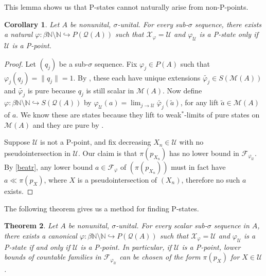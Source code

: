 \documentclass[10pt]{amsart}
\newtheorem{thm}{Theorem}[section]
\newtheorem{cor}[thm]{Corollary}
\theoremstyle{definition}
\newcommand{\Fp}{\mathscr{F}_\varphi}
\newcommand{\Xp}{\mathscr{X}_\varphi}
\newcommand{\U}{\mathscr{U}}
\begin{document}
This lemma shows us that P-states cannot naturally arise from non-P-points.

\begin{cor}\label{Pup}
    Let $A$ be nonunital, $\sigma$-unital. For every sub-$\sigma$ sequence, there exists a natural $\varphi:\beta\mathbb{N}\setminus\mathbb{N}\hookrightarrow P(\mathscr{Q}(A))$ such that $\Xp=\mathscr{U}$ and $\varphi_\mathscr{U}$ is a P-state only if $\U$ is a P-point.
\end{cor}

\begin{proof}
    Let $(q_j)$ be a sub-$\sigma$ sequence. Fix $\varphi_j\in P(A)$ such that $\varphi_j(q_j)=\|q_j\|=1$. By \cite[3.3.9]{MU90}, these each have unique extensions $\tilde{\varphi_j}\in S(\mathscr{M}(A))$ and $\tilde{\varphi_j}$ is pure because $q_j$ is still scalar in $\mathscr{M}(A)$. Now define $\varphi:\beta\mathbb{N}\setminus\mathbb{N}\hookrightarrow S(\mathscr{Q}(A))$ by $\varphi_\U(a)=\lim_{j\rightarrow\U}\tilde{\varphi_j}(\tilde{a})$, for any lift $\tilde{a}\in\mathscr{M}(A)$ of $a$. We know these are states because they lift to weak$^*$-limits of pure states on $\mathscr{M}(A)$ and they are pure by \cite[1]{AN79}.

    Suppose $\U$ is not a P-point, and fix decreasing $X_n\in\U$ with no pseudointersection in $\U$. Our claim is that $\pi(p_{X_n})$ has no lower bound in $\mathscr{F}_{\varphi_\U}$. By \ref{beatr}, any lower bound $a\in\Fp$ of $(\pi(p_{X_n}))$ must in fact have $a\ll \pi(p_X)$, where $X$ is a pseudointersection of $(X_n)$, therefore no such $a$ exists.
\end{proof}

The following theorem gives us a method for finding P-states.

\begin{thm}\label{stoneinj}
    Let $A$ be nonunital, $\sigma$-unital. For every scalar sub-$\sigma$ sequence in $A$, there exists a canonical $\varphi:\beta\mathbb{N}\setminus\mathbb{N}\hookrightarrow P(\mathscr{Q}(A))$ such that $\Xp=\mathscr{U}$ and $\varphi_\mathscr{U}$ is a P-state if and only if $\U$ is a P-point. In particular, if $\U$ is a P-point, lower bounds of countable families in $\mathscr{F}_{\varphi_\U}$ can be chosen of the form $\pi(p_X)$ for $X\in\U$.
\end{thm}
\end{document}
